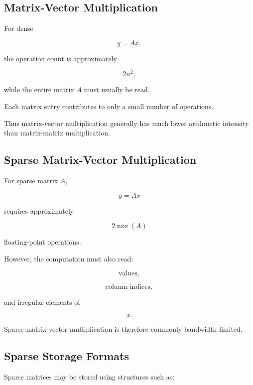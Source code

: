 \subsection{Matrix-Vector Multiplication}
\label{subsec:hpmc-matrix-vector}

For dense

\[
y=Ax,
\]

the operation count is approximately

\[
\boxed{
2n^2,
}
\]

while the entire matrix \(A\) must usually be read.

Each matrix entry contributes to only a small number of operations.

Thus matrix-vector multiplication generally has much lower arithmetic
intensity than matrix-matrix multiplication.

\subsection{Sparse Matrix-Vector Multiplication}
\label{subsec:hpmc-spmv}

For sparse matrix \(A\),

\[
\boxed{
y=Ax
}
\]

requires approximately

\[
\boxed{
2\operatorname{nnz}(A)
}
\]

floating-point operations.

However, the computation must also read:

\[
\boxed{
\text{values},
}
\]

\[
\boxed{
\text{column indices},
}
\]

and irregular elements of

\[
\boxed{
x.
}
\]

Sparse matrix-vector multiplication is therefore commonly bandwidth
limited.

\subsection{Sparse Storage Formats}
\label{subsec:hpmc-sparse-storage}

Sparse matrices may be stored using structures such as:

